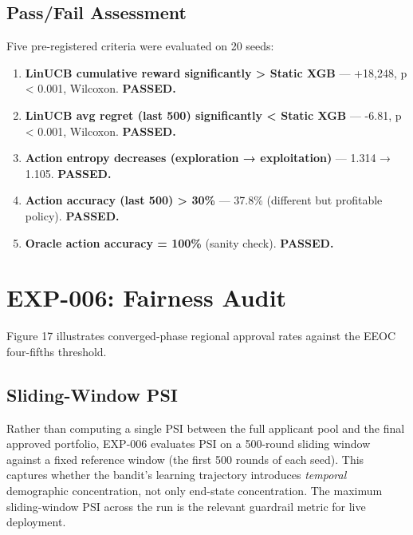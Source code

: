 \subsection{Pass/Fail Assessment}\label{passfail-assessment}

Five pre-registered criteria were evaluated on 20 seeds:

\begin{enumerate}
\def\labelenumi{\arabic{enumi}.}
\tightlist
\item
  \textbf{LinUCB cumulative reward significantly \textgreater{} Static XGB} --- +18,248, p \textless{} 0.001, Wilcoxon. \textbf{PASSED.}
\item
  \textbf{LinUCB avg regret (last 500) significantly \textless{} Static XGB} --- -6.81, p \textless{} 0.001, Wilcoxon. \textbf{PASSED.}
\item
  \textbf{Action entropy decreases (exploration → exploitation)} --- 1.314 → 1.105. \textbf{PASSED.}
\item
  \textbf{Action accuracy (last 500) \textgreater{} 30\%} --- 37.8\% (different but profitable policy). \textbf{PASSED.}
\item
  \textbf{Oracle action accuracy = 100\%} (sanity check). \textbf{PASSED.}
\end{enumerate}

\section{EXP-006: Fairness Audit}\label{exp-006-fairness-audit}

Figure 17 illustrates converged-phase regional approval rates against the EEOC four-fifths threshold.


\subsection{Sliding-Window PSI}\label{sliding-window-psi}

Rather than computing a single PSI between the full applicant pool and the final approved portfolio, EXP-006 evaluates PSI on a 500-round sliding window against a fixed reference window (the first 500 rounds of each seed). This captures whether the bandit's learning trajectory introduces \emph{temporal} demographic concentration, not only end-state concentration. The maximum sliding-window PSI across the run is the relevant guardrail metric for live deployment.

